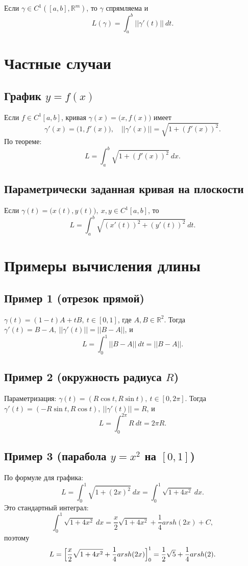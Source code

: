 \documentclass[14pt]{extreport}
\begin{document}
    \begin{theorem}
        Если $\gamma \in C^1([a,b], \mathbb{R}^m)$, то $\gamma$ спрямляема и
        \[
        L(\gamma) = \int_a^b ||\gamma'(t)||\ dt.
        \]
    \end{theorem}

    \section{Частные случаи}
    \subsection{График $y = f(x)$}
    Если $f \in C^1[a,b]$, кривая $\gamma(x) = \bigl( x,f(x) \bigr)$ имеет
    \[
    \gamma'(x) = \bigl( 1,f'(x) \bigr), \quad ||\gamma'(x)|| = \sqrt{1 + (f'(x))^2}.
    \]
    По теореме:
    \[
    L = \int_a^b \sqrt{1 + (f'(x))^2}\ dx.
    \]

    \subsection{Параметрически заданная кривая на плоскости}
    Если $\gamma(t) = \bigl( x(t),y(t) \bigr),\ x,y \in C^1[a,b]$, то
    \[
    L = \int_a^b \sqrt{(x'(t))^2 + (y'(t))^2}\ dt.
    \]

    \section{Примеры вычисления длины}
    \subsection{Пример 1 (отрезок прямой)}
    $\gamma(t) = (1-t)A + tB,\ t \in [0,1]$, где $A,B \in \mathbb{R}^2$. Тогда $\gamma'(t) = B - A,\ ||\gamma'(t)|| = ||B - A||$, и
    \[
    L = \int_0^1 ||B - A||\ dt = ||B - A||.
    \]

    \subsection{Пример 2 (окружность радиуса $R$)}
    Параметризация: $\gamma(t) = (R\cos t, R\sin t),\ t \in [0,2\pi]$. Тогда $\gamma'(t) = (-R\sin t, R\cos t),\ ||\gamma'(t)|| = R$, и
    \[
    L = \int_0^{2\pi} R\ dt = 2\pi R.
    \]

    \subsection{Пример 3 (парабола $y = x^2$ на $[0,1]$)}
    По формуле для графика:
    \[
    L = \int_0^1 \sqrt{1 + (2x)^2}\ dx = \int_0^1 \sqrt{1 + 4x^2}\ dx.
    \]
    Это стандартный интеграл:
    \[
    \int_0^1 \sqrt{1 + 4x^2}\ dx = \frac{x}{2} \sqrt{1 + 4x^2} + \frac{1}{4} arsh(2x) + C,
    \]
    поэтому 
    \[
    L = \Bigl[ \frac{x}{2} \sqrt{1 + 4x^2} + \frac{1}{4} arsh(2x) \Bigr]_0^1 = \frac{1}{2}\sqrt{5} + \frac{1}{4}arsh(2). 
    \]
\end{document}
